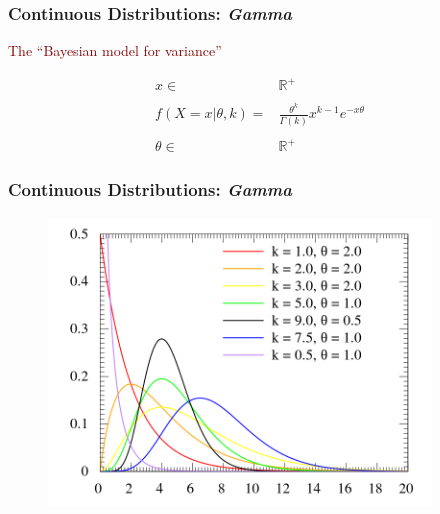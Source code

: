 \documentclass[xcolor={dvipsnames}]{beamer}
\begin{document}
\frame
{
 \frametitle{Continuous Distributions: \emph{Gamma}} %
 
 \Large

\textcolor{Maroon}{The ``Bayesian model for variance'' }

\LARGE
 
\begin{align*}
x \in {} & \mathbb{R}^+ \\\\
f(X=x|\theta,k) = {} & \frac{\theta^k}{\Gamma(k)} x^{k-1} e^{-x\theta}\\\\
\theta \in {} & \mathbb{R}^+
\end{align*}
}

\frame
{
 \frametitle{Continuous Distributions: \emph{Gamma}}
 
\begin{figure}
\centering
\includegraphics[width=4in]{stuff/gamma.png}
\end{figure}
}
\end{document}
